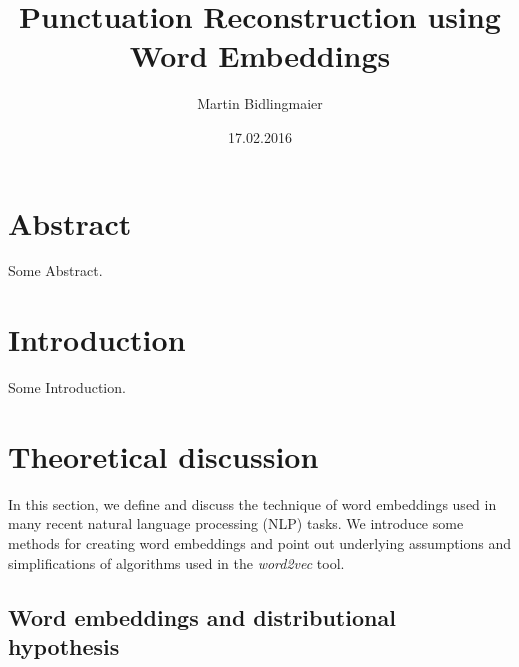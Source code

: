 \documentclass{amsart}
\theoremstyle{plain}
\theoremstyle{definition}
\begin{document}
\title{Punctuation Reconstruction using Word Embeddings}
\author{Martin Bidlingmaier}
\date{17.02.2016}
\maketitle

\section{Abstract}
  Some Abstract.

\section{Introduction}
  Some Introduction.

\section{Theoretical discussion}
In this section, we define and discuss the technique of word embeddings used in many recent natural language processing (NLP) tasks.
We introduce some methods for creating word embeddings and point out underlying assumptions and simplifications of algorithms used in the \emph{word2vec} tool.

\subsection{Word embeddings and distributional hypothesis}
\end{document}

